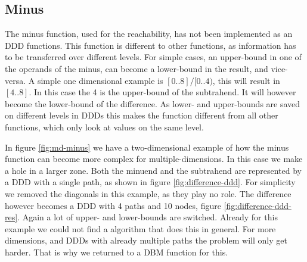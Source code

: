 \subsection{Minus}
The minus function, used for the reachability, has not been implemented as an DDD functions. This function is different to other functions, as information has to be transferred over different levels. For simple cases, an upper-bound in one of the operands of the minus, can become a lower-bound in the result, and vice-versa. A simple one dimensional example is $[0..8] / [0..4)$, this will result in $[4..8]$. In this case the 4 is the upper-bound of the subtrahend. It will however become the lower-bound of the difference. As lower- and upper-bounds are saved on different levels in DDDs this makes the function different from all other functions, which only look at values on the same level.

In figure \ref{fig:md-minus} we have a two-dimensional example of how the minus function can become more complex for multiple-dimensions. In this case we make a hole in a larger zone. Both the minuend and the subtrahend are represented by a DDD with a single path, as shown in figure \ref{fig:difference-ddd}. For simplicity we removed the diagonals in this example, as they play no role. The difference however becomes a DDD with 4 paths and 10 nodes, figure \ref{fig:difference-ddd-res}. Again a lot of upper- and lower-bounds are switched. Already for this example we could not find a algorithm that does this in general. For more dimensions, and DDDs with already multiple paths the problem will only get harder. That is why we returned to a DBM function for this.

